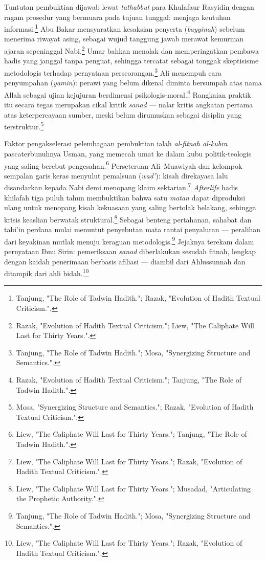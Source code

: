 Tuntutan pembuktian dijawab lewat \textit{tathabbut} para Khulafaur Rasyidin dengan ragam prosedur yang bermuara pada tujuan tunggal: menjaga keutuhan informasi.\footnote{Tanjung, "The Role of Tadwin Hadith."; Razak, "Evolution of Hadith Textual Criticism.".} Abu Bakar mensyaratkan kesaksian penyerta (\textit{bayyinah}) sebelum menerima riwayat asing, sebagai wujud tanggung jawab merawat kemurnian ajaran sepeninggal Nabi.\footnote{Razak, "Evolution of Hadith Textual Criticism."; Liew, "The Caliphate Will Last for Thirty Years.".} Umar bahkan menolak dan memperingatkan pembawa hadis yang janggal tanpa penguat, sehingga tercatat sebagai tonggak skeptisisme metodologis terhadap pernyataan perseorangan.\footnote{Tanjung, "The Role of Tadwin Hadith."; Mosa, "Synergizing Structure and Semantics.".} Ali menempuh cara penyumpahan (\textit{yamin}): perawi yang belum dikenal diminta bersumpah atas nama Allah sebagai ujian kejujuran berdimensi psikologis-moral.\footnote{Razak, "Evolution of Hadith Textual Criticism."; Tanjung, "The Role of Tadwin Hadith.".} Rangkaian praktik itu secara tegas merupakan cikal kritik \textit{sanad} --- nalar kritis angkatan pertama atas keterpercayaan sumber, meski belum dirumuskan sebagai disiplin yang terstruktur.\footnote{Mosa, "Synergizing Structure and Semantics."; Razak, "Evolution of Hadith Textual Criticism.".}

Faktor pengakselerasi pelembagaan pembuktian ialah \textit{al-fitnah al-kubra} pascaterbunuhnya Usman, yang memecah umat ke dalam kubu politik-teologis yang saling berebut pengesahan.\footnote{Liew, "The Caliphate Will Last for Thirty Years."; Tanjung, "The Role of Tadwin Hadith.".} Perseteruan Ali--Muawiyah dan kelompok sempalan garis keras menyulut pemalsuan (\textit{wad'}): kisah direkayasa lalu disandarkan kepada Nabi demi menopang klaim sektarian.\footnote{Liew, "The Caliphate Will Last for Thirty Years."; Razak, "Evolution of Hadith Textual Criticism.".} \textit{Afterlife} hadis khilafah tiga puluh tahun membuktikan bahwa satu \textit{matan} dapat diproduksi ulang untuk menopang kisah kekuasaan yang saling bertolak belakang, sehingga krisis keaslian berwatak struktural.\footnote{Liew, "The Caliphate Will Last for Thirty Years."; Musadad, "Articulating the Prophetic Authority.".} Sebagai benteng pertahanan, sahabat dan tabi'in perdana mulai menuntut penyebutan mata rantai penyaluran --- peralihan dari keyakinan mutlak menuju keraguan metodologis.\footnote{Tanjung, "The Role of Tadwin Hadith."; Mosa, "Synergizing Structure and Semantics.".} Jejaknya terekam dalam pernyataan Ibnu Sirin: pemeriksaan \textit{sanad} diberlakukan sesudah fitnah, lengkap dengan kaidah penerimaan berbasis afiliasi --- diambil dari Ahlussunnah dan ditampik dari ahli bidah.\footnote{Liew, "The Caliphate Will Last for Thirty Years."; Razak, "Evolution of Hadith Textual Criticism.".}

